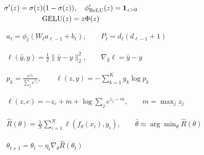 \documentclass[border=4pt,multi=preview]{standalone}
\begin{document}
\begin{preview}\color{ink}\fontsize{24}{30}\selectfont
$\displaystyle \begin{gathered}\sigma'(z)=\sigma(z)(1-\sigma(z)),\quad\phi_{\rm ReLU}'(z)=\mathbf{1}_{z>0}\\\operatorname{GELU}(z)=z\Phi(z)\end{gathered}$
\end{preview}
\begin{preview}\color{ink}\fontsize{24}{30}\selectfont
$\displaystyle \begin{gathered}a_\ell=\phi_\ell(W_\ell a_{\ell-1}+b_\ell),\qquad P_\ell=d_\ell(d_{\ell-1}+1)\end{gathered}$
\end{preview}
\begin{preview}\color{ink}\fontsize{24}{30}\selectfont
$\displaystyle \begin{gathered}\ell(\hat y,y)=\frac12\|\hat y-y\|_2^2,\qquad\nabla_{\hat y}\ell=\hat y-y\end{gathered}$
\end{preview}
\begin{preview}\color{ink}\fontsize{24}{30}\selectfont
$\displaystyle \begin{gathered}p_k=\frac{e^{z_k}}{\sum_j e^{z_j}},\qquad\ell(z,y)=-\sum_{k=1}^{K}y_k\log p_k\end{gathered}$
\end{preview}
\begin{preview}\color{ink}\fontsize{24}{30}\selectfont
$\displaystyle \begin{gathered}\ell(z,c)=-z_c+m+\log\sum_j e^{z_j-m},\qquad m=\max_j z_j\end{gathered}$
\end{preview}
\begin{preview}\color{ink}\fontsize{24}{30}\selectfont
$\displaystyle \begin{gathered}\hat R(\theta)=\frac1N\sum_{i=1}^{N}\ell(f_\theta(x_i),y_i),\qquad\hat\theta\approx\arg\min_\theta\hat R(\theta)\end{gathered}$
\end{preview}
\begin{preview}\color{ink}\fontsize{24}{30}\selectfont
$\displaystyle \begin{gathered}\theta_{t+1}=\theta_t-\eta_t\nabla_\theta\hat R(\theta_t)\end{gathered}$
\end{preview}
\end{document}
